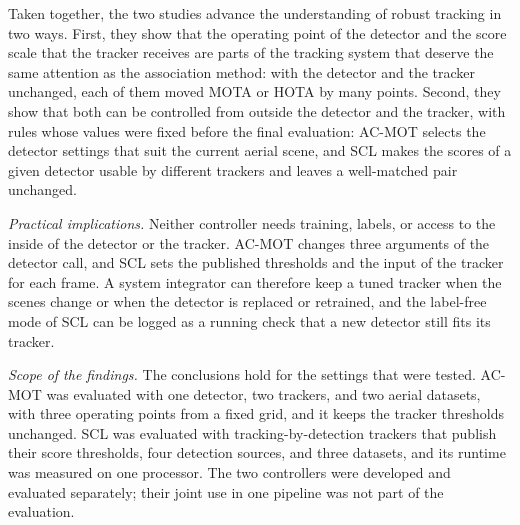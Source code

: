 Taken together, the two studies advance the understanding of robust tracking in two ways. First, they show that the operating point of the detector and the score scale that the tracker receives are parts of the tracking system that deserve the same attention as the association method: with the detector and the tracker unchanged, each of them moved MOTA or HOTA by many points. Second, they show that both can be controlled from outside the detector and the tracker, with rules whose values were fixed before the final evaluation: AC-MOT selects the detector settings that suit the current aerial scene, and SCL makes the scores of a given detector usable by different trackers and leaves a well-matched pair unchanged.

\emph{Practical implications.} Neither controller needs training, labels, or access to the inside of the detector or the tracker. AC-MOT changes three arguments of the detector call, and SCL sets the published thresholds and the input of the tracker for each frame. A system integrator can therefore keep a tuned tracker when the scenes change or when the detector is replaced or retrained, and the label-free mode of SCL can be logged as a running check that a new detector still fits its tracker.

\emph{Scope of the findings.} The conclusions hold for the settings that were tested. AC-MOT was evaluated with one detector, two trackers, and two aerial datasets, with three operating points from a fixed grid, and it keeps the tracker thresholds unchanged. SCL was evaluated with tracking-by-detection trackers that publish their score thresholds, four detection sources, and three datasets, and its runtime was measured on one processor. The two controllers were developed and evaluated separately; their joint use in one pipeline was not part of the evaluation.

